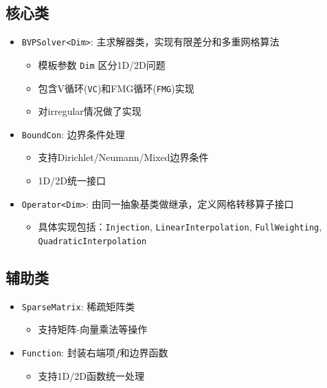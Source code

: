 \documentclass[a4paper]{ctexart} %
\begin{document}
\subsection{核心类}
\begin{itemize}
    \item \texttt{BVPSolver<Dim>}: 主求解器类，实现有限差分和多重网格算法
    \begin{itemize}
        \item 模板参数 \texttt{Dim} 区分1D/2D问题
        \item 包含V循环(\texttt{VC})和FMG循环(\texttt{FMG})实现
        \item 对irregular情况做了实现
    \end{itemize}
    
    \item \texttt{BoundCon}: 边界条件处理
    \begin{itemize}
        \item 支持Dirichlet/Neumann/Mixed边界条件
        \item 1D/2D统一接口
    \end{itemize}

    \item \texttt{Operator<Dim>}: 由同一抽象基类做继承，定义网格转移算子接口
    \begin{itemize}
        \item 具体实现包括：\texttt{Injection}, \texttt{LinearInterpolation}, \texttt{FullWeighting}, \texttt{QuadraticInterpolation}
    \end{itemize}
    

\end{itemize}

\subsection{辅助类}
\begin{itemize}
    \item \texttt{SparseMatrix}: 稀疏矩阵类
    \begin{itemize}
        \item 支持矩阵-向量乘法等操作
    \end{itemize}

    \item \texttt{Function}: 封装右端项$f$和边界函数
    \begin{itemize}
        \item 支持1D/2D函数统一处理
    \end{itemize}
\end{itemize}
\end{document}
